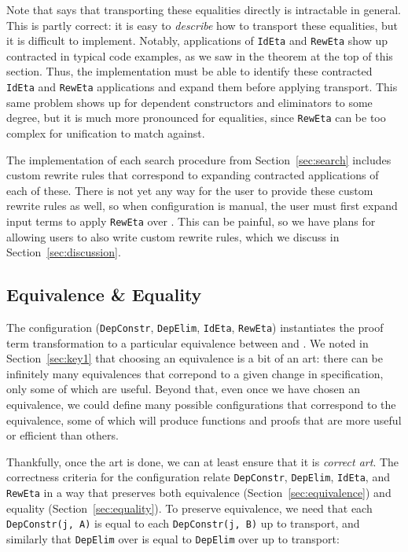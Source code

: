 Note that \citet{tabareau2019marriage} says that transporting these equalities directly
is intractable in general.
This is partly correct: it is easy to \textit{describe} how to transport these equalities,
but it is difficult to implement.
Notably, applications of \lstinline{IdEta} and \lstinline{RewEta} show up contracted in typical code examples,
as we saw in the theorem at the top of this section.
Thus, the implementation must be able to identify these contracted \lstinline{IdEta} and \lstinline{RewEta}
applications and expand them before applying transport.
This same problem shows up for dependent constructors and eliminators to some degree,
but it is much more pronounced for equalities,
since \lstinline{RewEta} can be too complex for unification to match against.

The implementation of each search procedure from Section~\ref{sec:search} includes custom rewrite rules that correspond to expanding
contracted applications of each of these.
There is not yet any way for the user to provide these custom rewrite rules as well,
so when configuration is manual, the user must first expand input terms to apply \lstinline{RewEta} over \A.
This can be painful, so we have plans for allowing users to also write custom rewrite rules,
which we discuss in Section~\ref{sec:discussion}.

\subsection{Equivalence \& Equality}
\label{sec:art}

The configuration (\lstinline{DepConstr}, \lstinline{DepElim}, \lstinline{IdEta}, \lstinline{RewEta}) instantiates
the proof term transformation to a particular equivalence between \A and \B.
We noted in Section~\ref{sec:key1} that choosing an equivalence is a bit of an art:
there can be infinitely many equivalences that correpond to a 
given change in specification, only some of which are useful.
Beyond that, even once we have chosen an equivalence, we could define many possible configurations that correspond
to the equivalence, some of which will produce functions and proofs that are more useful or efficient than others.

Thankfully, once the art is done, we can at least ensure that it is \textit{correct art}.
The correctness criteria for the configuration relate \lstinline{DepConstr}, \lstinline{DepElim}, \lstinline{IdEta}, and \lstinline{RewEta}
in a way that preserves both equivalence (Section~\ref{sec:equivalence}) and equality (Section~\ref{sec:equality}).
To preserve equivalence, we need that each \lstinline{DepConstr(j, A)} is equal to each \lstinline{DepConstr(j, B)} up to transport,
and similarly that \lstinline{DepElim} over \A is equal to \lstinline{DepElim} over \B up to transport:

